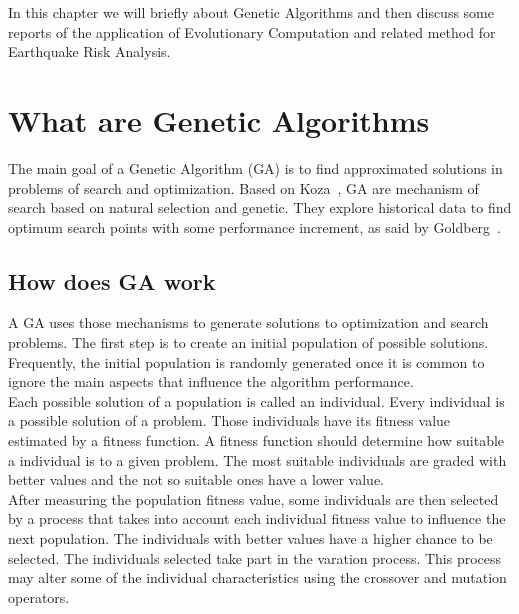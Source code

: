 In this chapter we will briefly about Genetic Algorithms and then discuss some reports of the application of Evolutionary Computation and related method for Earthquake Risk Analysis.\\

\section{What are Genetic Algorithms}
The main goal of a Genetic Algorithm (GA) is to find approximated solutions in problems of search and optimization. Based on Koza~\cite{koza2003genetic}, GA are mechanism of search based on natural selection and genetic. They explore historical data to find optimum search points with some performance increment, as said by Goldberg~\cite{Goldberg:1989:GAS:534133}.\\

\subsection{How does GA work}

A GA uses those mechanisms to generate solutions to optimization and search problems. The first step is to create an initial population of possible solutions. Frequently, the initial population is randomly generated once it is common to ignore the main aspects that influence the algorithm performance.\\

Each possible solution of a population is called an individual. Every individual is a possible solution of a problem. Those individuals have its fitness value estimated by a fitness function. A fitness function should determine how suitable a individual is to a given problem. The most suitable individuals are graded with better values and the not so suitable ones have a lower value.\\

After measuring the population fitness value, some individuals are then selected by a process that takes into account each individual fitness value to influence the next population. The individuals with better values have a higher chance to be selected. The individuals selected take part in the varation process. This process may alter some of the individual characteristics using the crossover and mutation operators.\\

